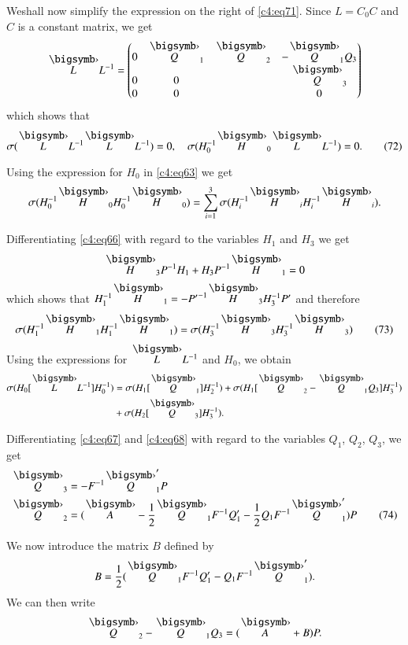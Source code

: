 We\pageoriginale shall now simplify the expression on the right of
\eqref{c4:eq71}. Since $L=C_{0}C$ and $C$ is a constant matrix, we get
$$
\overdot{L}L^{-1}=
\begin{pmatrix}
0 & \overdot{Q}_{1} & \overdot{Q}_{2} & -\overdot{Q}_{1}Q_{3}\\
 0 & 0 & & \overdot{Q}_{3}\\
0 & 0 & & 0
\end{pmatrix}
$$
which shows that
\begin{equation*}
\sigma(\overdot{L}L^{-1}\overdot{L}L^{-1})=0,\quad
\sigma(H^{-1}_{0}\overdot{H}_{0}\overdot{L}L^{-1})=0.\tag{72}\label{c4:eq72}
\end{equation*}

Using the expression for $H_{0}$ in \eqref{c4:eq63} we get
$$
\sigma(H^{-1}_{0}\overdot{H}_{0}H^{-1}_{0}\overdot{H}_{0})=\sum^{3}_{i=1}\sigma(H^{-1}_{i}\overdot{H}_{i}H^{-1}_{i}\overdot{H}_{i}). 
$$

Differentiating \eqref{c4:eq66} with regard to the variables $H_{1}$ and
$H_{3}$ we get
$$
\overdot{H}_{3}P^{-1}H_{1}+H_{3}P^{-1}\overdot{H}_{1}=0 
$$
which shows that
$H^{-1}_{1}\overdot{H}_{1}=-{P'}^{-1}\overdot{H}_{3}H^{-1}_{3}P'$ and
therefore
\begin{equation*}
\sigma(H^{-1}_{1}\overdot{H}_{1}H^{-1}_{1}\overdot{H}_{1})=\sigma(H^{-1}_{3}\overdot{H}_{3}H^{-1}_{3}\overdot{H}_{3})\tag{73}\label{c4:eq73}
\end{equation*}
Using the expressions for $\overdot{L}L^{-1}$ and $H_{0}$, we obtain
\begin{align*}
\sigma(H_{0}[\overdot{L}L^{-1}]H^{-1}_{0}) &=
\sigma(H_{1}[\overdot{Q}_{1}]H^{-1}_{2})+\sigma(H_{1}[\overdot{Q}_{2}-\overdot{Q}_{1}Q_{3}]H^{-1}_{3})\\
&+\sigma(H_{2}[\overdot{Q}_{3}]H^{-1}_{3}).
\end{align*}

Differentiating \eqref{c4:eq67} and \eqref{c4:eq68} with regard to the variables
$Q_{1}$, $Q_{2}$, $Q_{3}$, we get
\begin{align*}
\overdot{Q}_{3} &= -F^{-1}\overdot{Q}'_{1}P\\
\overdot{Q}_{2} &=
(\overdot{A}-\frac{1}{2}\overdot{Q}_{1}F^{-1}Q'_{1}-\frac{1}{2}Q_{1}F^{-1}\overdot{Q}'_{1})P\tag{74}\label{c4:eq74} 
\end{align*} 

We now introduce the matrix $B$ defined by 
$$
B=\frac{1}{2}(\overdot{Q}_{1}F^{-1}Q'_{1}-Q_{1}F^{-1}\overdot{Q}'_{1}). 
$$\pageoriginale
We can then write
$$
\overdot{Q}_{2}-\overdot{Q}_{1}Q_{3}=(\overdot{A}+B)P.
$$

